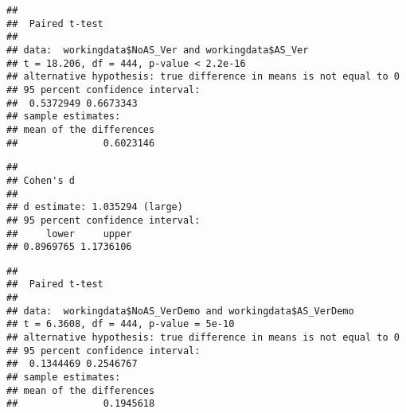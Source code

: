 \documentclass[]{article}
\newenvironment{Shaded}{\begin{snugshade}}{\end{snugshade}}
\newcommand{\KeywordTok}[1]{\textcolor[rgb]{0.13,0.29,0.53}{\textbf{#1}}}
\newcommand{\DataTypeTok}[1]{\textcolor[rgb]{0.13,0.29,0.53}{#1}}
\newcommand{\CommentTok}[1]{\textcolor[rgb]{0.56,0.35,0.01}{\textit{#1}}}
\newcommand{\OtherTok}[1]{\textcolor[rgb]{0.56,0.35,0.01}{#1}}
\newcommand{\OperatorTok}[1]{\textcolor[rgb]{0.81,0.36,0.00}{\textbf{#1}}}
\newcommand{\NormalTok}[1]{#1}
\begin{document}
\begin{Shaded}
\end{Shaded}

\begin{verbatim}
## 
##  Paired t-test
## 
## data:  workingdata$NoAS_Ver and workingdata$AS_Ver
## t = 18.206, df = 444, p-value < 2.2e-16
## alternative hypothesis: true difference in means is not equal to 0
## 95 percent confidence interval:
##  0.5372949 0.6673343
## sample estimates:
## mean of the differences 
##               0.6023146
\end{verbatim}

\begin{Shaded}
\end{Shaded}

\begin{verbatim}
## 
## Cohen's d
## 
## d estimate: 1.035294 (large)
## 95 percent confidence interval:
##     lower     upper 
## 0.8969765 1.1736106
\end{verbatim}

\begin{Shaded}
\end{Shaded}

\begin{verbatim}
## 
##  Paired t-test
## 
## data:  workingdata$NoAS_VerDemo and workingdata$AS_VerDemo
## t = 6.3608, df = 444, p-value = 5e-10
## alternative hypothesis: true difference in means is not equal to 0
## 95 percent confidence interval:
##  0.1344469 0.2546767
## sample estimates:
## mean of the differences 
##               0.1945618
\end{verbatim}
\end{document}
